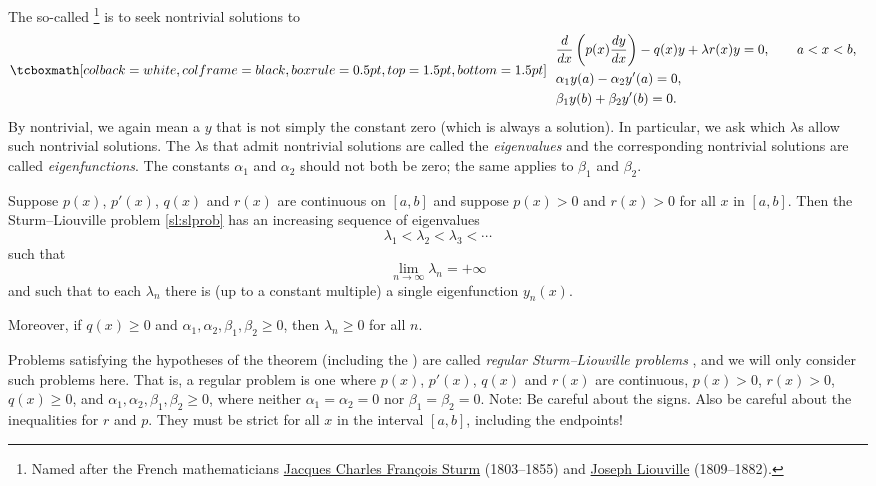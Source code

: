 The so-called 
\emph{}%
\footnote{Named after the French mathematicians
\href{https://en.wikipedia.org/wiki/Jacques_Charles_Fran\%C3\%A7ois_Sturm}{Jacques Charles Fran\c{c}ois Sturm}
(1803--1855) and
\href{https://en.wikipedia.org/wiki/Liouville}{Joseph Liouville}
(1809--1882).} is to seek
nontrivial solutions to
\begin{equation} \label{sl:slprob}
\mybxbg{~~
\begin{aligned}
&\frac{d}{dx} \left( p(x) \frac{dy}{dx} \right)
- q(x) y + \lambda r(x) y = 0, \qquad a < x < b, \\
&\alpha_1 y(a) - \alpha_2 y'(a) = 0, \\
&\beta_1 y(b) + \beta_2 y'(b) = 0.
\end{aligned}
~~}
\end{equation}
By nontrivial, we again mean a $y$ that is not simply
the constant zero (which is always a solution).
In particular, we ask which $\lambda$s
allow such nontrivial solutions.
The $\lambda$s that admit nontrivial solutions
are called the \emph{eigenvalues}
and the corresponding
nontrivial solutions are called
\emph{eigenfunctions}.
The constants $\alpha_1$ and $\alpha_2$
should not both be zero;
the same applies to
$\beta_1$ and $\beta_2$.

\begin{theorem} \label{sl:slregthm}
Suppose $p(x)$, $p'(x)$, $q(x)$ and $r(x)$ are continuous on $[a,b]$
and suppose $p(x) > 0$ and $r(x) > 0$ for all $x$ in $[a,b]$.
Then the Sturm--Liouville problem \eqref{sl:slprob}
has an increasing sequence of eigenvalues
\begin{equation*}
\lambda_1 < \lambda_2 < \lambda_3 < \cdots 
\end{equation*}
such that
\begin{equation*}
\lim_{n \to \infty} \lambda_n = +\infty
\end{equation*}
and such that to each $\lambda_n$ there is (up to a constant multiple)
a single eigenfunction $y_n(x)$. 

Moreover, if $q(x) \geq 0$ and $\alpha_1, \alpha_2, \beta_1, \beta_2 \geq 0$,
then $\lambda_n \geq 0$ for all $n$.
\end{theorem}

Problems satisfying the hypotheses of the theorem
(including the )
are called
\emph{regular Sturm--Liouville problems}%
,
and we will only consider such problems here.
That is, a regular problem is one where
$p(x)$, $p'(x)$, $q(x)$ and $r(x)$ are continuous, $p(x) > 0$, $r(x) > 0$,
$q(x) \geq 0$, and $\alpha_1, \alpha_2, \beta_1, \beta_2 \geq 0$,
where neither $\alpha_1=\alpha_2=0$
nor
$\beta_1=\beta_2=0$.
Note: Be careful about the signs.  Also be careful about the inequalities
for $r$ and $p$.
They
must be strict for all $x$ in the interval $[a,b]$, including the endpoints!

